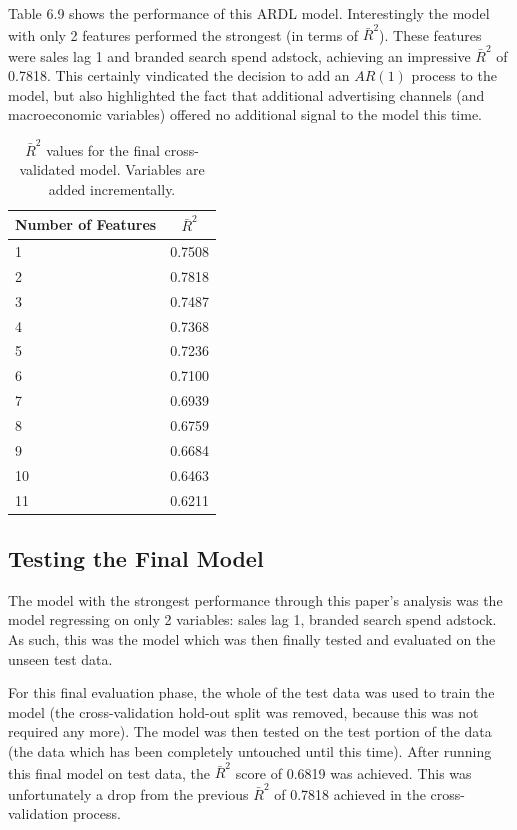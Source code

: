 \documentclass[11pt, a4paper]{article}
\begin{document}
Table 6.9 shows the performance of this ARDL model. Interestingly the model with only 2 features performed the strongest (in terms of $\bar{R}^2$). These features were sales lag 1 and branded search spend adstock, achieving an impressive $\bar{R}^2$ of 0.7818. This certainly vindicated the decision to add an $AR(1)$ process to the model, but also highlighted the fact that additional advertising channels (and macroeconomic variables) offered no additional signal to the model this time. 

\begin{table}[h!]
    \centering
\begin{tabular}{lc}
    \toprule
    \textbf{Number of Features} & \textbf{$\bar{R}^2$} \\
    \midrule
    1  & 0.7508 \\
    2  & 0.7818 \\
    3  & 0.7487 \\
    4  & 0.7368 \\
    5  & 0.7236 \\
    6  & 0.7100 \\
    7  & 0.6939 \\
    8  & 0.6759 \\
    9  & 0.6684 \\
    10 & 0.6463 \\
    11 & 0.6211 \\
    \bottomrule
\end{tabular}
    \caption{$\bar{R}^2$
 values for the final cross-validated model. Variables are added incrementally.}
    \label{tab:features_score}
\end{table}


\subsection{Testing the Final Model}

The model with the strongest performance through this paper’s analysis was the model regressing on only 2 variables: sales lag 1, branded search spend adstock. As such, this was the model which was then finally tested and evaluated on the unseen test data. 

For this final evaluation phase, the whole of the test data was used to train the model (the cross-validation hold-out split was removed, because this was not required any more). The model was then tested on the test portion of the data (the data which has been completely untouched until this time). After running this final model on test data, the $\bar{R}^2$
 score of 0.6819 was achieved. This was unfortunately a drop from the previous $\bar{R}^2$ of 0.7818 achieved in the cross-validation process. 
\end{document}
